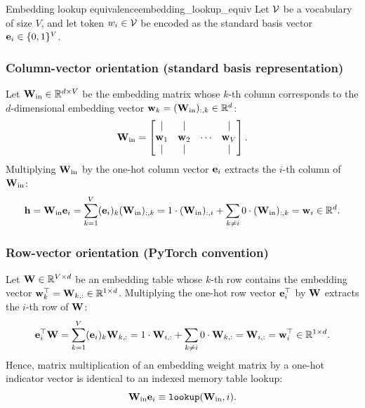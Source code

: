 \documentclass[../../../main.tex]{subfiles}
\begin{document}
\begin{theorem}{Embedding lookup equivalence}{embedding_lookup_equiv}
Let $\mathcal{V}$ be a vocabulary of size $V$, and let token $w_i \in \mathcal{V}$ be encoded as the standard basis vector $\mathbf{e}_i \in \{0, 1\}^V$.

\subsubsection{Column-vector orientation (standard basis representation)}  
Let $\mathbf{W}_{\text{in}} \in \mathbb{R}^{d \times V}$ be the embedding matrix whose $k$-th column corresponds to the $d$-dimensional embedding vector $\mathbf{w}_k = (\mathbf{W}_{\text{in}})_{:, k} \in \mathbb{R}^d$:
\begin{equation}
\label{eq:win_column_blocks}
\mathbf{W}_{\text{in}} = \begin{bmatrix} \vert & \vert & & \vert \\ \mathbf{w}_1 & \mathbf{w}_2 & \cdots & \mathbf{w}_V \\ \vert & \vert & & \vert \end{bmatrix}.
\end{equation}
Multiplying $\mathbf{W}_{\text{in}}$ by the one-hot column vector $\mathbf{e}_i$ extracts the $i$-th column of $\mathbf{W}_{\text{in}}$:
\begin{equation}
\label{eq:column_lookup_proof}
\mathbf{h} = \mathbf{W}_{\text{in}} \mathbf{e}_i = \sum_{k=1}^V (\mathbf{e}_i)_k (\mathbf{W}_{\text{in}})_{:, k} = 1 \cdot (\mathbf{W}_{\text{in}})_{:, i} + \sum_{k \neq i} 0 \cdot (\mathbf{W}_{\text{in}})_{:, k} = \mathbf{w}_i \in \mathbb{R}^d.
\end{equation}

\subsubsection{Row-vector orientation (PyTorch convention)}  
Let $\mathbf{W} \in \mathbb{R}^{V \times d}$ be an embedding table whose $k$-th row contains the embedding vector $\mathbf{w}_k^\top = \mathbf{W}_{k, :} \in \mathbb{R}^{1 \times d}$. Multiplying the one-hot row vector $\mathbf{e}_i^\top$ by $\mathbf{W}$ extracts the $i$-th row of $\mathbf{W}$:
\begin{equation}
\label{eq:row_lookup_proof}
\mathbf{e}_i^\top \mathbf{W} = \sum_{k=1}^V (\mathbf{e}_i)_k \mathbf{W}_{k, :} = 1 \cdot \mathbf{W}_{i, :} + \sum_{k \neq i} 0 \cdot \mathbf{W}_{k, :} = \mathbf{W}_{i, :} = \mathbf{w}_i^\top \in \mathbb{R}^{1 \times d}.
\end{equation}
Hence, matrix multiplication of an embedding weight matrix by a one-hot indicator vector is identical to an indexed memory table lookup:
\begin{equation}
\label{eq:lookup_linear_identity}
\mathbf{W}_{\text{in}} \mathbf{e}_i \equiv \text{\texttt{lookup}}(\mathbf{W}_{\text{in}}, i).
\end{equation}
\end{theorem}
\end{document}
